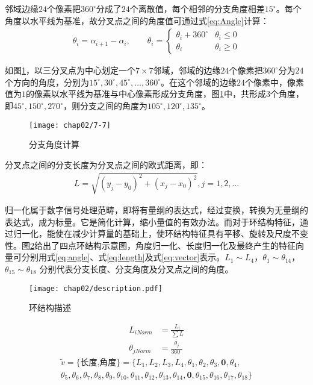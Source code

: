 邻域边缘$24$个像素把$360^{\circ}$分成了$24$个离散值，每个相邻的分支角度相差$15^{\circ}$。每个角度以水平线为基准，故分叉点之间的角度值可通过式\ref{eq:Angle}计算：
\begin{align}
\theta_i = \alpha_{i+1} - \alpha_i, \qquad
\theta_i = \left\{ \begin{array}{ll}
\theta_i + 360^{\circ} & \theta_i \le 0 \\
\theta_i & \theta_i \geq 0
\end{array} \right.
\label{eq:Angle}
\end{align}

如图\ref{fig:calculate-angles}，以三分叉点为中心划定一个$7\times7$邻域，邻域的边缘$24$个像素把$360^{\circ}$分为$24$个方向的角度，分别为$15^{\circ}, 30^{\circ},45^{\circ}, \ldots, 360^{\circ}$。在这个邻域的边缘$24$个像素中，像素值为$1$的像素以水平线为基准与中心像素形成分支角度，图\ref{fig:calculate-angles}中，共形成$3$个角度，即$45^{\circ}, 150^{\circ},270^{\circ}$，则分支之间的角度为$105^{\circ}, 120^{\circ}, 135^{\circ}$。

\begin{figure}[H]
\centering
\texttt{[image: chap02/7-7]}
\caption{分支角度计算}
\label{fig:calculate-angles}
\end{figure}

分叉点之间的分支长度为分叉点之间的欧式距离，即：
\begin{align}
L = \sqrt{(y_j - y_0)^2 + (x_j - x_0)^2}, j = 1, 2, \ldots
\end{align}

归一化属于数字信号处理范畴，即将有量纲的表达式，经过变换，转换为无量纲的表达式，成为标量。它是简化计算，缩小量值的有效办法。而对于环结构特征，通过归一化，能使在减少计算量的基础上，使环结构特征具有平移、旋转及尺度不变性。图\ref{fig:description}给出了四点环结构示意图，角度归一化、长度归一化及最终产生的特征向量可分别用式\ref{eq:angle}、式\ref{eq:length}及式\ref{eq:vector}表示。$L_{1} \sim L_{4}$，$\theta_{1} \sim \theta_{14}$，$\theta_{15} \sim \theta_{18}$ 分别代表分支长度、分支角度及分叉点之间的角度。

\begin{figure}[H]
\centering
\texttt{[image: chap02/description.pdf]}
\caption{环结构描述}
\label{fig:description}
\end{figure}
\begin{align}
L_{iNorm}&=\frac{L_i}{\sum{L}}\label{eq:length}\\
\theta_{jNorm}&=\frac{\theta_j}{360^\circ}\label{eq:angle}
\end{align}
\begin{multline}
\tilde{v}=\{\textrm{长度,角度}\}=\{L_{1},L_{2},L_{3},L_{4},\theta_{1},\theta_{2},\theta_{3},\mathbf{0},\theta_{4},\\\theta_{5},\theta_{6},\theta_{7},\theta_{8},\theta_{9},\theta_{10},\theta_{11},\theta_{12},\theta_{13},\theta_{14},\mathbf{0},\theta_{15},\theta_{16},\theta_{17},\theta_{18}\}
\label{eq:vector}
\end{multline}

